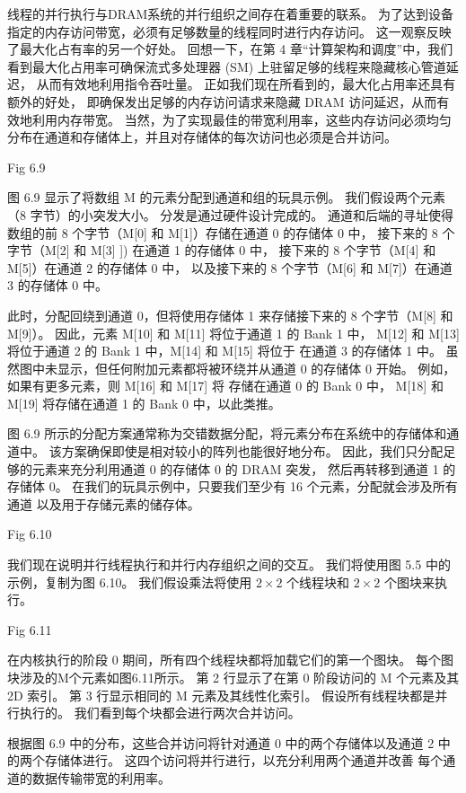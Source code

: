线程的并行执行与DRAM系统的并行组织之间存在着重要的联系。 
为了达到设备指定的内存访问带宽，必须有足够数量的线程同时进行内存访问。 
这一观察反映了最大化占有率的另一个好处。 
回想一下，在第 4 章“计算架构和调度”中，我们看到最大化占用率可确保流式多处理器 (SM) 上驻留足够的线程来隐藏核心管道延迟，
从而有效地利用指令吞吐量。 正如我们现在所看到的，最大化占用率还具有额外的好处，
即确保发出足够的内存访问请求来隐藏 DRAM 访问延迟，从而有效地利用内存带宽。 
当然，为了实现最佳的带宽利用率，这些内存访问必须均匀分布在通道和存储体上，并且对存储体的每次访问也必须是合并访问。

{\color{red} Fig 6.9}

图 6.9 显示了将数组 M 的元素分配到通道和组的玩具示例。 我们假设两个元素（8 字节）的小突发大小。 
分发是通过硬件设计完成的。 通道和后端的寻址使得数组的前 8 个字节（M[0] 和 M[1]）存储在通道 0 的存储体 0 中，
接下来的 8 个字节（M[2] 和 M[3] ]) 在通道 1 的存储体 0 中，
接下来的 8 个字节（M[4] 和 M[5]）在通道 2 的存储体 0 中，
以及接下来的 8 个字节（M[6] 和 M[7]）在通道 3 的存储体 0 中。

此时，分配回绕到通道 0，但将使用存储体 1 来存储接下来的 8 个字节（M[8] 和 M[9]）。 
因此，元素 M[10] 和 M[11] 将位于通道 1 的 Bank 1 中，
M[12] 和 M[13] 将位于通道 2 的 Bank 1 中，M[14] 和 M[15] 将位于 在通道 3 的存储体 1 中。
虽然图中未显示，但任何附加元素都将被环绕并从通道 0 的存储体 0 开始。
例如，如果有更多元素，则 M[16] 和 M[17] 将 存储在通道 0 的 Bank 0 中，
M[18] 和 M[19] 将存储在通道 1 的 Bank 0 中，以此类推。

图 6.9 所示的分配方案通常称为交错数据分配，将元素分布在系统中的存储体和通道中。 
该方案确保即使是相对较小的阵列也能很好地分布。 因此，我们只分配足够的元素来充分利用通道 0 的存储体 0 的 DRAM 突发，
然后再转移到通道 1 的存储体 0。
在我们的玩具示例中，只要我们至少有 16 个元素，分配就会涉及所有通道 以及用于存储元素的储存体。

{\color{red} Fig 6.10}

我们现在说明并行线程执行和并行内存组织之间的交互。 我们将使用图 5.5 中的示例，复制为图 6.10。 
我们假设乘法将使用 $2 \times 2$ 个线程块和 $2 \times 2$ 个图块来执行。

{\color{red} Fig 6.11}

在内核执行的阶段 0 期间，所有四个线程块都将加载它们的第一个图块。 每个图块涉及的M个元素如图6.11所示。 
第 2 行显示了在第 0 阶段访问的 M 个元素及其 2D 索引。 第 3 行显示相同的 M 元素及其线性化索引。 
假设所有线程块都是并行执行的。 我们看到每个块都会进行两次合并访问。

根据图 6.9 中的分布，这些合并访问将针对通道 0 中的两个存储体以及通道 2 中的两个存储体进行。
这四个访问将并行进行，以充分利用两个通道并改善 每个通道的数据传输带宽的利用率。

